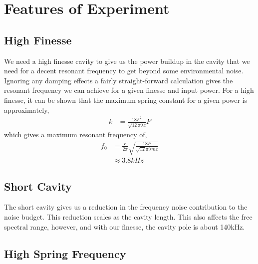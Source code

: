\section{Features of Experiment}
\subsection{High Finesse}
We need a high finesse cavity to give us the power buildup in the cavity that
we need for a decent resonant frequency to get beyond some environmental noise.
Ignoring any damping effects a fairly straight-forward calculation gives the
resonant frequency we can achieve for a given finesse and input power. For a
high finesse, it can be shown that the maximum spring constant for a given
power is approximately,
\begin{align}
k &= \frac{18 F^2}{\sqrt{12} \pi \lambda c} P
\end{align}
which gives a maximum resonant frequency of,
\begin{align}
f_0 &= \frac{F}{2 \pi} \sqrt{\frac{18 P}{\sqrt{12} \pi \lambda m c }} \\
&\approx 3.8kHz
\end{align}

\subsection{Short Cavity}
\label{sec:lin_short}
The short cavity gives us a reduction in the frequency noise contribution
to the noise budget. This reduction scales as the cavity length. This also
affects the free spectral range, however, and with our finesse, the cavity
pole is about 140kHz. 

\subsection{High Spring Frequency}

